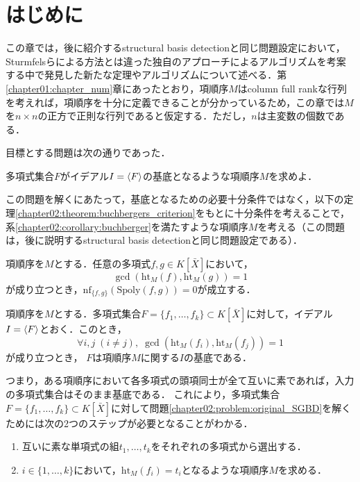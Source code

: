 \section{はじめに}
この章では，後に紹介するstructural \groebner{} basis detectionと同じ問題設定において，Sturmfelsらによる方法とは違った独自のアプローチによるアルゴリズムを考案する中で発見した新たな定理やアルゴリズムについて述べる．第\ref{chapter01:chapter_num}章にあったとおり，項順序$M$はcolumn full rankな行列を考えれば，項順序を十分に定義できることが分かっているため，この章では$M$を$n \times n$の正方で正則な行列であると仮定する．ただし，$n$は主変数の個数である．
\par
目標とする問題は次の通りであった．
\begin{problem}
	\label{chapter02:problem:original_SGBD}
	多項式集合$F$がイデアル$I = \langle F \rangle$の\groebner{}基底となるような項順序$M$を求めよ．
\end{problem}
この問題を解くにあたって，\groebner{}基底となるための必要十分条件ではなく，以下の定理\ref{chapter02:theorem:buchbergers_criterion}をもとに十分条件を考えることで，系\ref{chapter02:corollary:buchberger}を満たすような項順序$M$を考える（この問題は，後に説明するstructural \groebner{} basis detectionと同じ問題設定である）．
\begin{theorem}[Buchbergerの判定条件]
	\label{chapter02:theorem:buchbergers_criterion}
	項順序を$M$とする．任意の多項式$f, g \in K[\bar{X}]$において，$$\gcd(\mathrm{ht}_M(f), \mathrm{ht}_M(g))=1$$が成り立つとき，$\mathrm{nf}_{\{f, g\}}(\mathrm{Spoly}(f, g)) = 0$が成立する．
	\end{theorem}
	\begin{corollary}
	\label{chapter02:corollary:buchberger}
	項順序を$M$とする．多項式集合$F=\{ f_1, \dots, f_k \} \subset K[\bar{X}]$に対して，イデアル$I = \langle F \rangle$とおく．このとき，
	$$\forall i, j \; (i \ne j), \; \gcd(\mathrm{ht}_M(f_i), \mathrm{ht}_M(f_j))=1$$
	が成り立つとき， $F$は項順序$M$に関する$I$の\groebner{}基底である．
\end{corollary}
つまり，ある項順序において各多項式の頭項同士が全て互いに素であれば，入力の多項式集合はそのまま\groebner{}基底である．
これにより，多項式集合$F = \{f_1, \dots, f_k\}\subset K[\bar{X}]$に対して問題\ref{chapter02:problem:original_SGBD}を解くためには次の2つのステップが必要となることがわかる．
\par
\begin{enumerate}
	\item 互いに素な単項式の組$t_1, \dots, t_k$をそれぞれの多項式から選出する．
	\item $i \in \{1, \dots, k\}$において，$\mathrm{ht}_M(f_i) = t_i$となるような項順序$M$を求める．
\end{enumerate}




